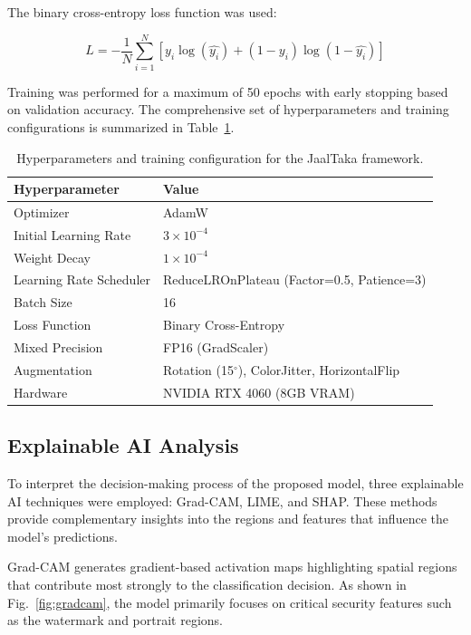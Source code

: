 \documentclass[preprint,12pt,authoryear]{elsarticle}
\begin{document}
The binary cross-entropy loss function was used:

\begin{equation}
L = -\frac{1}{N}\sum_{i=1}^{N}
[y_i \log(\hat{y_i}) + (1-y_i)\log(1-\hat{y_i})]
\end{equation}

Training was performed for a maximum of 50 epochs with early stopping based on validation accuracy. The comprehensive set of hyperparameters and training configurations is summarized in Table~\ref{tab:hyperparameters}.

\begin{table}[ht]
\centering
\caption{Hyperparameters and training configuration for the JaalTaka framework.}
\begin{tabular}{ll}
\hline
Hyperparameter & Value \\
\hline
Optimizer & AdamW \\
Initial Learning Rate & $3 \times 10^{-4}$ \\
Weight Decay & $1 \times 10^{-4}$ \\
Learning Rate Scheduler & ReduceLROnPlateau (Factor=0.5, Patience=3) \\
Batch Size & 16 \\
Loss Function & Binary Cross-Entropy \\
Mixed Precision & FP16 (GradScaler) \\
Augmentation & Rotation (15$^{\circ}$), ColorJitter, HorizontalFlip \\
Hardware & NVIDIA RTX 4060 (8GB VRAM) \\
\hline
\end{tabular}
\label{tab:hyperparameters}
\end{table}


\subsection{Explainable AI Analysis}

To interpret the decision-making process of the proposed model, three explainable AI techniques were employed: Grad-CAM, LIME, and SHAP. These methods provide complementary insights into the regions and features that influence the model's predictions.

Grad-CAM generates gradient-based activation maps highlighting spatial regions that contribute most strongly to the classification decision. As shown in Fig.~\ref{fig:gradcam}, the model primarily focuses on critical security features such as the watermark and portrait regions.
\end{document}
